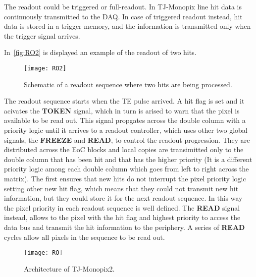 The readout could be triggered or full-readout. In TJ-Monopix line hit data is continuously transmitted to the DAQ. In case of triggered readout instead, hit data is stored in a trigger memory, and the information is transmitted only when the trigger signal arrives.

In~\autoref{fig:RO2} is displayed an example of the readout of two hits. 

\begin{figure}[h!]
\centering
\texttt{[image: RO2]}
\caption{Schematic of a readout sequence where two hits are being processed.}
\label{fig:RO2}
\end{figure}

The readout sequence starts when the TE pulse arrived. A hit flag is set and it acivates the \textsc{\textbf{TOKEN}} signal, which in turn is arised to warn that the pixel is available to be read out. This signal propgates across the double column with a priority logic until it arrives to a readout controller, which uses other two global signals, the \textsc{\textbf{FREEZE}} and \textsc{\textbf{READ}}, to control the readout progression. They are distributed across the EoC blocks and local copies are transimitted only to the double column that has been hit and that has the higher priority (It is a different priority logic among each double column which goes from left to right across the matrix).
The first ensures that new hits do not interrupt the pixel priority logic setting other new hit flag, which means that they could not transmit new hit information, but they could store it for the next readout sequence. In this way the pixel priority in each readout sequence is well defined. The \textsc{\textbf{READ}} signal instead, allows to the pixel with the hit flag and highest priority to access the data bus and transmit the hit information to the periphery. A series of \textsc{\textbf{READ}} cycles allow all pixels in the sequence to be read out.


\begin{figure}[h!]
\centering
\texttt{[image: RO]}
\caption{Architecture of TJ-Monopix2.}
\label{fig:RO}
\end{figure}



